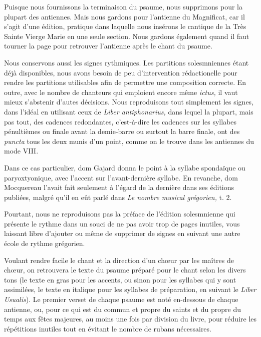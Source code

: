 \begin{frpars}
Puisque nous fournissons la terminaison du psaume, nous supprimons  pour la plupart des antiennes. Mais nous gardons  pour l'antienne du Magnificat, car il s'agit d'une édition, pratique dans laquelle nous insérons le cantique de la Très Sainte Vierge Marie en une seule section. Nous gardons également  quand il faut tourner la page pour retrouver l'antienne après le chant du psaume.


Nous conservons aussi les signes rythmiques. Les partitions solesmniennes étant déjà disponibles, nous avons besoin de peu d'intervention rédactionelle pour rendre les partitions utilisables afin de permettre une composition correcte. En outre, avec le nombre de chanteurs qui emploient encore même \textit{ictus,} il vaut mieux s'abstenir d'autes décisions. Nous reproduisons tout simplement les signes, dans l'idéal en utilisant ceux de \textit{Liber antiphonarius,} dans lequel la plupart, mais pas tout, des cadences redondantes, c’est-à-dire les cadences sur les syllabes pénultièmes ou finale avant la demie-barre ou surtout la barre finale, ont des \textit{puncta} tous les deux munis d'un point, comme on le trouve dans les antiennes du mode VIII.

Dans ce cas particulier, dom Gajard donna le point à la syllabe spondaïque ou paryoxtyonique, avec l'accent sur l'avant-dernière syllabe. En revanche, dom Mocquereau l'avait fait seulement à l'égard de la dernière dans ses éditions publiées, malgré qu'il en eût parlé dans \textit{Le nombre musical grégorien,} t. 2.

Pourtant, nous ne reproduisons pas la préface de l'édition solesmnienne qui présente le rythme dans un souci de ne pas avoir trop de pages inutiles, vous laissant libre d'ajouter ou même de supprimer de signes en suivant une autre école de rythme grégorien.

Voulant rendre facile le chant et la direction d'un chœur par les maîtres de chœur, on retrouvera le texte du psaume préparé pour le chant selon les divers tons (le texte en gras pour les accents, ou sinon pour les syllabes qui y sont assimilées, le texte en italique pour les syllabes de préparation, en suivant le \textit{Liber Usualis}). Le premier verset de chaque psaume est noté en-dessous de chaque antienne, ou, pour ce qui est du commun et propre du saints et du propre du temps aux fêtes majeures, au moins une fois par division du livre, pour réduire les répétitions inutiles tout en évitant le nombre de rubans nécessaires.


\end{frpars}
